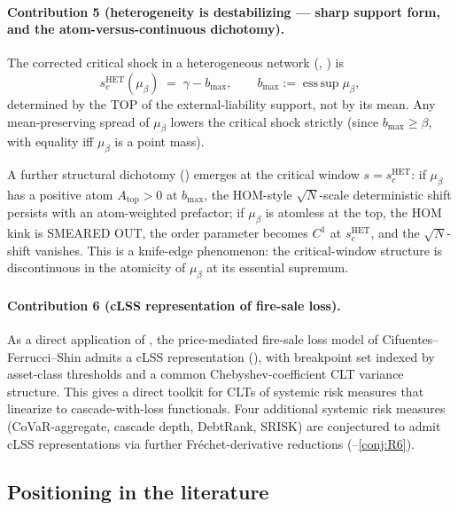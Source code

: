 \documentclass[11pt,a4paper]{article}
\theoremstyle{definition}
\newcommand{\HET}{\mathrm{HET}}
\begin{document}
\paragraph{Contribution 5 (heterogeneity is destabilizing --- sharp support
form, and the atom-versus-continuous dichotomy).} The corrected critical
shock in a heterogeneous network (, ) is
\[
s_c^{\HET}(\mu_\beta)\;=\;\gamma - b_{\max},\qquad b_{\max} := \operatorname{ess\,sup}\mu_\beta,
\]
determined by the TOP of the external-liability support, not by its mean.
Any mean-preserving spread of $\mu_\beta$ lowers the critical shock strictly
(since $b_{\max}\geq\beta$, with equality iff $\mu_\beta$ is a point mass).

A further structural dichotomy () emerges at the
critical window $s = s_c^{\HET}$: if $\mu_\beta$ has a positive atom
$A_{\text{top}} > 0$ at $b_{\max}$, the HOM-style $\sqrt N$-scale deterministic
shift persists with an atom-weighted prefactor; if $\mu_\beta$ is atomless at
the top, the HOM kink is SMEARED OUT, the order parameter becomes $C^1$ at
$s_c^{\HET}$, and the $\sqrt N$-shift vanishes. This is a knife-edge
phenomenon: the critical-window structure is discontinuous in the
atomicity of $\mu_\beta$ at its essential supremum.

\paragraph{Contribution 6 (cLSS representation of fire-sale loss).} As a
direct application of , the price-mediated fire-sale loss
model of Cifuentes--Ferrucci--Shin \cite{CFS2005} admits a cLSS representation
(), with breakpoint set indexed by asset-class thresholds and
a common Chebyshev-coefficient CLT variance structure. This gives a direct
toolkit for CLTs of systemic risk measures that linearize to cascade-with-loss
functionals. Four additional systemic risk measures (CoVaR-aggregate,
cascade depth, DebtRank, SRISK) are conjectured to admit cLSS representations
via further Fr\'echet-derivative reductions (--\ref{conj:R6}).

\subsection{Positioning in the literature}
\end{document}
